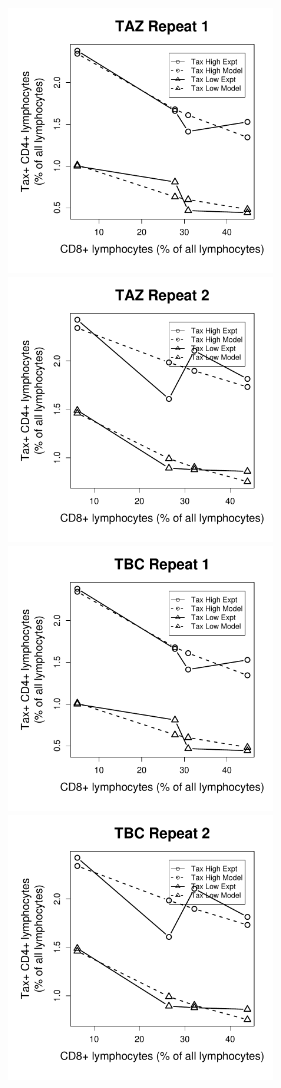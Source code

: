 \begin{figure}[htp]
\centering
\includegraphics[width=7cm]{./Figures/chapter5/figure_lysis_taz_rep_1}%
\hspace{0cm}%
\includegraphics[width=7cm]{./Figures/chapter5/figure_lysis_taz_rep_2} \\
\includegraphics[width=7cm]{./Figures/chapter5/figure_lysis_tbc_rep_1}%
\hspace{0cm}%
\includegraphics[width=7cm]{./Figures/chapter5/figure_lysis_tbc_rep_2} \\

\end{figure}
